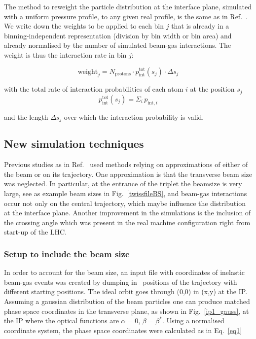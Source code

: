 The method to reweight the particle distribution at the interface plane, simulated with a uniform pressure profile, to any given real profile, is the same as in Ref.~\cite{nimPaperRod}. We write down the weights to be applied to each bin $j$ that is already in a binning-independent representation (division by bin width or bin area) and already normalised by the number of simulated beam-gas interactions. The weight is thus the interaction rate in bin $j$:

\begin{equation} \label{eq3}
\mathrm{weight}_j = N_{\mathrm{protons}} \cdot p_{\mathrm{int}}^{\mathrm{tot}} (s_j) \cdot \Delta s_{j} 
\end{equation}

with the total rate of interaction probabilities of each atom $i$ at the position $s_j$ 
\begin{equation*} 
  p_{\mathrm{int}}^{\mathrm{tot}} (s_j) = \Sigma_i \, p_{\textrm{int},i}
\end{equation*}

and the length $\Delta s_{j}$ over which the interaction probability is valid.

\subsection{New simulation techniques}
Previous studies as in Ref.~\cite{nimPaperRod} used methods relying on approximations of either of the beam or on its trajectory. One approximation is that the transverse beam size was neglected. In particular, at the entrance of the triplet the beamsize is very large, see as example beam sizes in Fig.~\ref{twissfileBS}, and beam-gas interactions occur not only on the central trajectory, which maybe influence the distribution at the interface plane. Another improvement in the simulations is the inclusion of the crossing angle which was present in the real machine configuration right from start-up of the LHC.

\subsubsection{Setup to include the beam size}

In order to account for the beam size, an input file with coordinates of inelastic beam-gas events was created by dumping in \fluka~positions of the trajectory with different starting positions. The ideal orbit goes through (0,0) in (x,y) at the IP. Assuming a gaussian distribution of the beam particles one can produce matched phase space coordinates in the transverse plane, as shown in Fig.~\ref{ip1_gauss}, at the IP where the optical functions are $\alpha = 0$, $\beta = \beta^*$. Using a normalised coordinate system, the phase space coordinates were calculated as in Eq.~\ref{eq1}

